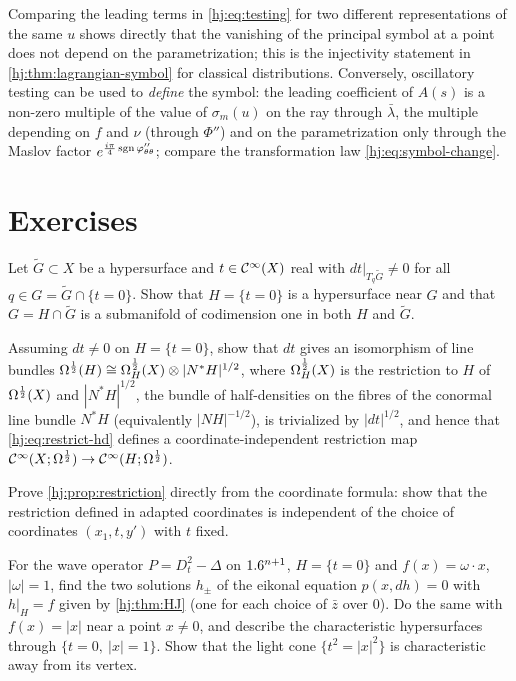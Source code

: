 Comparing the leading terms in \eqref{hj:eq:testing} for two different
representations of the same $u$ shows directly that the vanishing of the
principal symbol at a point does not depend on the parametrization; this is the
injectivity statement in \cref{hj:thm:lagrangian-symbol} for classical
distributions.  Conversely, oscillatory testing can be used to \emph{define}
the symbol: the leading coefficient of $A(s)$ is a non-zero multiple of the
value of $\sigma_m(u)$ on the ray through $\bar\lambda$, the multiple depending
on $f$ and $\nu$ (through $\Phi''$) and on the parametrization only through the
Maslov factor $e^{\frac{i\pi}4\operatorname{sgn}\varphi''_{\theta\theta}}$; compare the
transformation law \eqref{hj:eq:symbol-change}.

\section{Exercises}\label{hj:sec:exercises}

\begin{exercise}\label{hj:ex:transversal}
  Let $\tilde G\subset X$ be a hypersurface and $t\in\mathcal{C}^\infty(X)$ real with
  $dt|_{T_q\tilde G}\neq0$ for all $q\in G=\tilde G\cap\{t=0\}$.  Show that
  $H=\{t=0\}$ is a hypersurface near $G$ and that $G=H\cap\tilde G$ is a
  submanifold of codimension one in both $H$ and $\tilde G$.
\end{exercise}

\begin{exercise}\label{hj:ex:restriction-hd}
  Assuming $dt\ne0$ on $H=\{t=0\}$, show that $dt$ gives an isomorphism of line
  bundles $\Omega^{\frac12}(H)\cong\Omega^{\frac12}_H(X)\otimes|N^*H|^{1/2}$, where
  $\Omega^{\frac12}_H(X)$ is the restriction to $H$ of $\Omega^{\frac12}(X)$ and $|N^*H|^{1/2}$, the
  bundle of half-densities on the fibres of the conormal line bundle $N^*H$
  (equivalently $|NH|^{-1/2}$), is trivialized by $|dt|^{1/2}$, and hence that \eqref{hj:eq:restrict-hd} defines a
  coordinate-independent restriction map $\mathcal{C}^\infty(X;\Omega^{\frac12})\to\mathcal{C}^\infty(H;\Omega^{\frac12})$.
\end{exercise}

\begin{exercise}\label{hj:ex:restriction-direct}
  Prove \cref{hj:prop:restriction} directly from the coordinate formula: show that
  the restriction defined in adapted coordinates is independent of the choice of
  coordinates $(x_1,t,y')$ with $t$ fixed.
\end{exercise}

\begin{exercise}\label{hj:ex:wave-eikonal}
  For the wave operator $P=D_t^2-\Delta$ on $1.6^{n+1}$, $H=\{t=0\}$ and
  $f(x)=\omega\cdot x$, $|\omega|=1$, find the two solutions $h_\pm$ of the
  eikonal equation $p(x,dh)=0$ with $h|_H=f$ given by \cref{hj:thm:HJ} (one for
  each choice of $\bar z$ over $0$).  Do the same with $f(x)=|x|$ near a point
  $x\ne0$, and describe the characteristic hypersurfaces through
  $\{t=0,\ |x|=1\}$.  Show that the light cone $\{t^2=|x|^2\}$ is characteristic
  away from its vertex.
\end{exercise}

